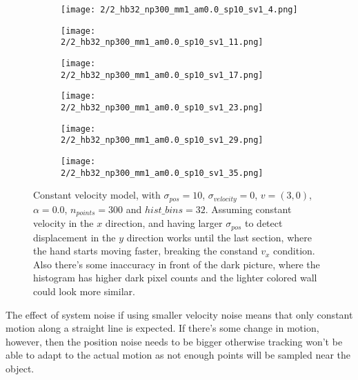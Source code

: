 \documentclass[10pt,a4paper,twoside]{article}
\newcommand{\sweepsize}{0.26}
\begin{document}
\begin{figure}[h]
    \centering
    \begin{subfigure}{\sweepsize\textwidth}
    \texttt{[image: 2/2\_hb32\_np300\_mm1\_am0.0\_sp10\_sv1\_4.png]} 
    \end{subfigure}
    \begin{subfigure}{\sweepsize\textwidth}
    \texttt{[image: 2/2\_hb32\_np300\_mm1\_am0.0\_sp10\_sv1\_11.png]} 
    \end{subfigure}
    \begin{subfigure}{\sweepsize\textwidth}
    \texttt{[image: 2/2\_hb32\_np300\_mm1\_am0.0\_sp10\_sv1\_17.png]} 
    \end{subfigure}
    \begin{subfigure}{\sweepsize\textwidth}
    \texttt{[image: 2/2\_hb32\_np300\_mm1\_am0.0\_sp10\_sv1\_23.png]} 
    \end{subfigure}
    \begin{subfigure}{\sweepsize\textwidth}
    \texttt{[image: 2/2\_hb32\_np300\_mm1\_am0.0\_sp10\_sv1\_29.png]} 
    \end{subfigure}
    \begin{subfigure}{\sweepsize\textwidth}
    \texttt{[image: 2/2\_hb32\_np300\_mm1\_am0.0\_sp10\_sv1\_35.png]} 
    \end{subfigure}
    \caption{Constant velocity model, with $\sigma_{pos}=10$, $\sigma_{velocity}=0$, $v=(3,0)$, $\alpha=0.0$, $n_{points}=300$
    and $hist\_bins=32$. Assuming constant velocity in the $x$ direction, and
    having larger $\sigma_{pos}$ to detect displacement in the $y$ direction
    works until the last section, where the hand starts moving faster, breaking
    the constand $v_x$ condition. Also there's some inaccuracy in front of the
    dark picture, where the histogram has higher dark pixel counts and the
    lighter colored wall could look more similar.}
\end{figure}


The effect of system noise if using smaller velocity noise means that only constant motion along a straight
line is expected. If there's some change in motion, however, then the position
noise needs to be bigger otherwise tracking won't be able to adapt to the actual motion as not enough points will be sampled near the object.
\end{document}
